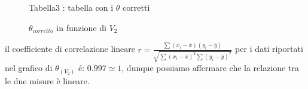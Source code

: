 \documentclass[a4paper]{article}
\theoremstyle{definition}
\begin{document}
\begin{figure}[!htbp]
	\captionsetup{labelformat=empty}
	\caption{Tabella3 : tabella con i \(\theta\) corretti}
\end{figure}

\begin{figure}[!htbp]
	\captionsetup{labelformat=empty}
	\caption{\(\theta_{corretto}\) in funzione di \(V_{2}\)}
\end{figure}
\noindent il coefficiente di correlazione lineare \(r = \frac{\sum (x_{i}-\bar{x})(y_{i}-\bar{y})}{\sqrt{\sum (x_{i}-\bar{x})^{2}\sum (y_{i}-\bar{y})^{2}}}\) per i dati riportati nel grafico di \(\theta_{(V_{2})}\) é: \(0.997\simeq 1\), dunque possiamo affermare che la relazione tra le due misure è lineare.
\end{document}
